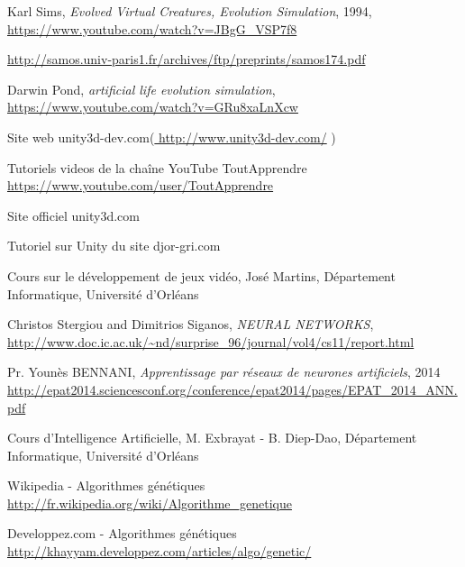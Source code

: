 \begin{thebibliography}{99}



 

Karl Sims,
 \emph{Evolved Virtual Creatures, Evolution Simulation}, 1994,
 \url{https://www.youtube.com/watch?v=JBgG\_VSP7f8}

 \url{http://samos.univ-paris1.fr/archives/ftp/preprints/samos174.pdf}

Darwin Pond,
\emph{artificial life evolution simulation},
\url{https://www.youtube.com/watch?v=GRu8xaLnXcw}


 Site web unity3d-dev.com(\url{ http://www.unity3d-dev.com/}  )

Tutoriels videos de la chaîne YouTube ToutApprendre \url{https://www.youtube.com/user/ToutApprendre}

Site officiel unity3d.com

Tutoriel sur Unity du site djor-gri.com

Cours sur le développement de jeux vidéo, José Martins, Département Informatique, Université d'Orléans

Christos Stergiou and Dimitrios Siganos,
\emph{NEURAL NETWORKS}, 
\url{http://www.doc.ic.ac.uk/~nd/surprise_96/journal/vol4/cs11/report.html}

Pr. Younès BENNANI,
\emph{Apprentissage par réseaux de neurones artificiels}, 2014
\url{http://epat2014.sciencesconf.org/conference/epat2014/pages/EPAT_2014_ANN.pdf}

Cours d'Intelligence Artificielle, M. Exbrayat - B. Diep-Dao, Département Informatique, Université d'Orléans

Wikipedia - Algorithmes génétiques \url{http://fr.wikipedia.org/wiki/Algorithme_genetique}

Developpez.com - Algorithmes génétiques \url{http://khayyam.developpez.com/articles/algo/genetic/}



\end{thebibliography}
